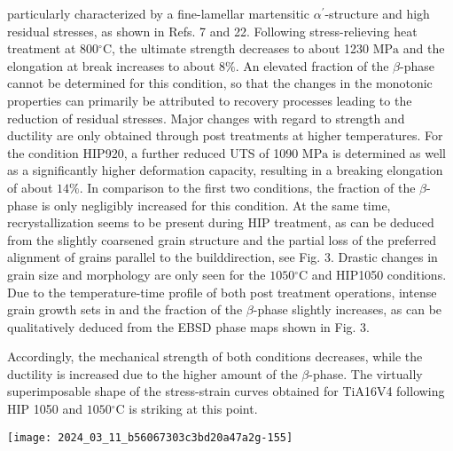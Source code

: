 \documentclass[10pt]{article}
\begin{document}
particularly characterized by a fine-lamellar martensitic $\alpha^{\prime}$-structure and high residual stresses, as shown in Refs. 7 and 22. Following stress-relieving heat treatment at $800{ }^{\circ} \mathrm{C}$, the ultimate strength decreases to about 1230 $\mathrm{MPa}$ and the elongation at break increases to about $8 \%$. An elevated fraction of the $\beta$-phase cannot be determined for this condition, so that the changes in the monotonic properties can primarily be attributed to recovery processes leading to the reduction of residual stresses. Major changes with regard to strength and ductility are only obtained through post treatments at higher temperatures. For the condition HIP920, a further reduced UTS of 1090 $\mathrm{MPa}$ is determined as well as a significantly higher deformation capacity, resulting in a breaking elongation of about $14 \%$. In comparison to the first two conditions, the fraction of the $\beta$-phase is only negligibly increased for this condition. At the same time, recrystallization seems to be present during HIP treatment, as can be deduced from the slightly coarsened grain structure and the partial loss of the preferred alignment of grains parallel to the builddirection, see Fig. 3. Drastic changes in grain size and morphology are only seen for the $1050{ }^{\circ} \mathrm{C}$ and HIP1050 conditions. Due to the temperature-time profile of both post treatment operations, intense grain growth sets in and the fraction of the $\beta$-phase slightly increases, as can be qualitatively deduced from the EBSD phase maps shown in Fig. 3.

Accordingly, the mechanical strength of both conditions decreases, while the ductility is increased due to the higher amount of the $\beta$-phase. The virtually superimposable shape of the stress-strain curves obtained for TiA16V4 following HIP 1050 and $1050{ }^{\circ} \mathrm{C}$ is striking at this point.

\begin{center}
\texttt{[image: 2024\_03\_11\_b56067303c3bd20a47a2g-155]}
\end{center}
\end{document}
